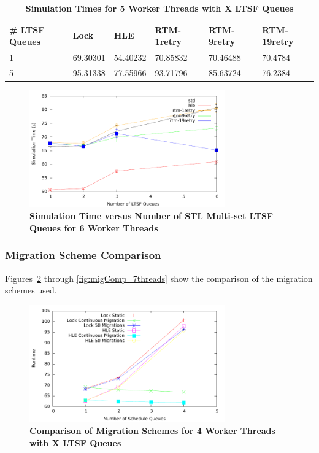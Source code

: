 \documentclass[11pt]{book}
\begin{document}
\begin{table}
    \centering
    \begin{tabular}{l|p{2cm}|p{2cm}|p{2cm}|p{2cm}|p{2cm}}
        \textbf{\# LTSF Queues}&Lock &HLE &RTM-1retry &RTM-9retry &RTM-19retry \\
        \hline
        \midrule
            1 &69.30301  &54.40232 &70.85832  &70.46488 &70.4784 \\ 
            5 &95.31338  &77.55966 &93.71796  &85.63724 &76.2384 \\
    \end{tabular}
    \caption{\textbf{Simulation Times for 5 Worker Threads with X LTSF
        Queues}}\label{tab:xThrMig_5threadsXschq}
\end{table}

\begin{figure}
    \centering
    \graphicspath{ {./figures/} }
    \includegraphics[width=0.75\textwidth,keepaspectratio]{hugeepidemicsim-XEVENTmig-timeVSschedQs-multiset-6thread}
    \caption{\textbf{Simulation Time versus Number of STL Multi-set LTSF Queues for 6
        Worker Threads}}\label{fig:xThrMig_timeVSschq_6threads}
\end{figure}

\subsubsection{Migration Scheme Comparison}

Figures~\ref{fig:migComp_4threads} through \ref{fig:migComp_7threads} show the comparison
of the migration schemes used.

\begin{figure}
    \centering
    \graphicspath{ {./figures/} }
    \includegraphics[width=0.75\textwidth,keepaspectratio]{migComp_4threads}
    \caption{\textbf{Comparison of Migration Schemes for 4 Worker Threads with X LTSF
        Queues}}\label{fig:migComp_4threads}
\end{figure}
\end{document}
